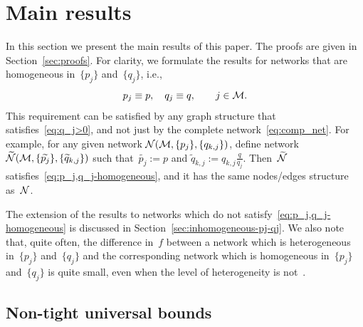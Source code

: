 \documentclass[review]{elsarticle}
\begin{document}
%
%
\section{Main results}
\label{sec:main_results}
In this section we present the main results of this paper. The proofs are given in Section~\ref{sec:proofs}.
For clarity, we formulate the results for networks  that are homogeneous in~$\{p_j\}$ and~$\{q_j\}$, i.e.,
\begin{equation}
	\label{eq:p_j,q_j-homogeneous}
	p_j\equiv p, \quad q_j \equiv q,\qquad j\in{\cal M}.
\end{equation}
This requirement can be satisfied by any graph structure that satisfies~\eqref{eq:q_j>0}, 
and not just by the complete network~\eqref{eq:comp_net}. For example, for any given network ${\cal N}({\cal M},\{p_j\}, \{q_{k,j}\})$, define network~$\widetilde{{\cal N}}({\cal M},\{\widetilde{p_j}\}, \{\widetilde{q}_{k,j}\})$ such that~$\widetilde{p_j}:=p$ and $\widetilde{q}_{k,j}:=q_{k,j}\frac{q}{q_j}$. Then~$\widetilde{{\cal N}}$ satisfies~\eqref{eq:p_j,q_j-homogeneous}, and it has the same nodes/edges structure as~$\cal N$.

The extension of the results to networks which do not satisfy~\eqref{eq:p_j,q_j-homogeneous} is discussed in Section~\ref{sec:inhomogeneous-pj-qj}. We also note that, quite often,
the difference in~$f$ between a network which is heterogeneous in~$\{p_j\}$ and~$\{q_j\}$
and the corresponding network which is homogeneous in~$\{p_j\}$ and~$\{q_j\}$
is quite small, even when the level of heterogeneity is not~\citep{OR-10,PNAS-12}.


\subsection{Non-tight universal bounds}
\end{document}
